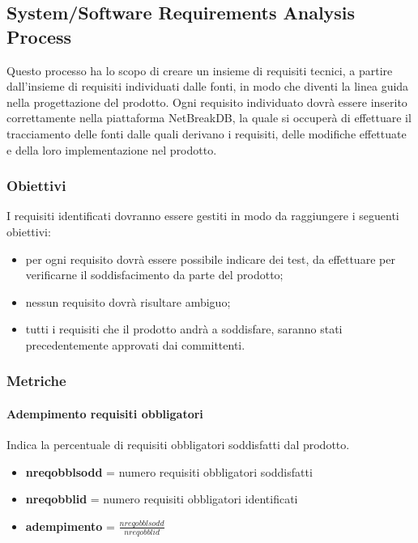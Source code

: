 			
	
	\subsection{System/Software Requirements Analysis Process}
	Questo processo ha lo scopo di creare un insieme di requisiti tecnici, a partire dall'insieme di requisiti individuati dalle fonti, in modo che diventi la linea guida nella progettazione del prodotto.
	Ogni requisito individuato dovrà essere inserito correttamente nella piattaforma NetBreakDB, la quale si occuperà di effettuare il tracciamento delle fonti dalle quali derivano i requisiti, delle modifiche effettuate e della loro implementazione nel prodotto.
		\subsubsection{Obiettivi}
		I requisiti identificati dovranno essere gestiti in modo da raggiungere i seguenti obiettivi:
		\begin{itemize}
			\item per ogni requisito dovrà essere possibile indicare dei test, da effettuare per verificarne il soddisfacimento da parte del prodotto;
			\item nessun requisito dovrà risultare ambiguo;
			\item tutti i requisiti che il prodotto andrà a soddisfare, saranno stati precedentemente approvati dai committenti.
		\end{itemize}
		\subsubsection{Metriche}
			\paragraph{Adempimento requisiti obbligatori}
			Indica la percentuale di requisiti obbligatori soddisfatti dal prodotto.
			
			\begin{itemize}
				\item \textbf{nreqobblsodd} = numero requisiti obbligatori soddisfatti
				\item \textbf{nreqobblid} = numero requisiti obbligatori identificati
				\item \textbf{adempimento} =  \begin{math}
				\frac{nreqobblsodd}{nreqobblid}
				\end{math} 
			\end{itemize}
			
